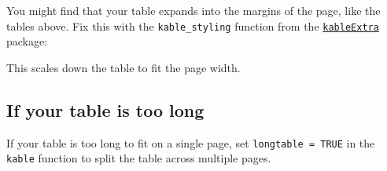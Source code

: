 \documentclass[a4paper, nobind]{templates/ociamthesis}
\begin{document}
You might find that your table expands into the margins of the page, like the tables above.
Fix this with the \texttt{kable\_styling} function from the \href{https://haozhu233.github.io/kableExtra/}{\texttt{kableExtra}} package:

\begin{table}
\centering
{}
\end{table}

This scales down the table to fit the page width.

\hypertarget{if-your-table-is-too-long}{%
\subsection{If your table is too long}\label{if-your-table-is-too-long}}

If your table is too long to fit on a single page, set \texttt{longtable\ =\ TRUE} in the \texttt{kable} function to split the table across multiple pages.
\end{document}
